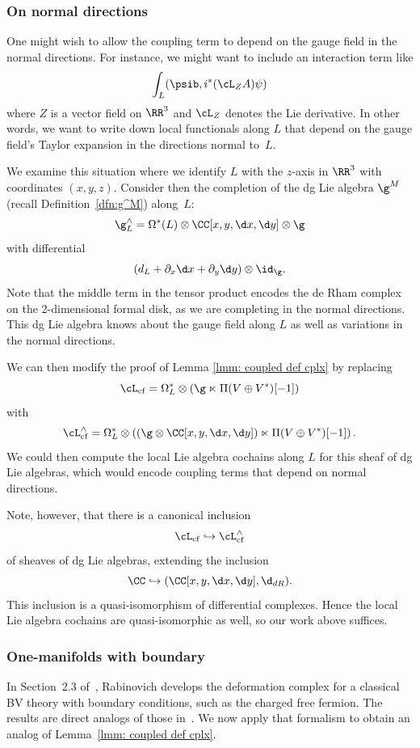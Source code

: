 \documentclass[10pt]{amsart}
\begin{document}
\subsubsection{On normal directions}
\label{rmk on normal directions}

One might wish to allow the coupling term to depend on the gauge field in the normal directions.
For instance, we might want to include an interaction term like 
\[
\int_L (\psib, i^*( \cL_Z A) \psi) 
\]
where $Z$ is a vector field on $\RR^3$ and $\cL_Z$ denotes the Lie derivative.
In other words, we want to write down local functionals along $L$ that depend on the gauge field's Taylor expansion in the directions normal to~$L$.

We examine this situation where we identify $L$ with the $z$-axis in $\RR^3$ with coordinates $(x,y,z)$.
Consider then the completion of the dg Lie algebra $\g^M$ (recall Definition~\ref{dfn:g^M}) along~$L$:
\[
\g^\wedge_L = \Omega^*(L) \otimes \CC[x,y,\d x, \d y] \otimes \g
\]
with differential 
\[
(d_L + \partial_x \d x + \partial_y \d y) \otimes \id_\g.
\]
Note that the middle term in the tensor product encodes the de Rham complex on the 2-dimensional formal disk, 
as we are completing in the normal directions.
This dg Lie algebra knows about the gauge field along $L$ as well as variations in the normal directions.

We can then modify the proof of Lemma \ref{lmm: coupled def cplx} by replacing
\[
\cL_{\rm cf} = \Omega^*_L \otimes (\g \ltimes \Pi(V \oplus V^*)[-1])
\]
with
\[
\cL^\wedge_{\rm cf} = \Omega^*_L \otimes \left( (\g \otimes \CC[x,y,\d x, \d y]) \ltimes \Pi(V \oplus V^*)[-1]\right).
\]
We could then compute the local Lie algebra cochains along $L$ for this sheaf of dg Lie algebras,
which would encode coupling terms that depend on normal directions.

Note, however, that there is a canonical inclusion
\[
\cL_{\rm cf} \hookrightarrow \cL^\wedge_{\rm cf}
\]
of sheaves of dg Lie algebras,
extending the inclusion 
\[
\CC \hookrightarrow ( \CC[x,y,\d x, \d y] , \d_{dR}).
\]
This inclusion is a quasi-isomorphism of differential complexes.
Hence the local Lie algebra cochains are quasi-isomorphic as well,
so our work above suffices.

\subsubsection{One-manifolds with boundary}

In Section~2.3 of~\cite{RabThesis},
Rabinovich develops the deformation complex for a classical BV theory with boundary conditions,
such as the charged free fermion.
The results are direct analogs of those in~\cite{CosBook}.
We now apply that formalism to obtain an analog of Lemma~\ref{lmm: coupled def cplx}.
\end{document}
